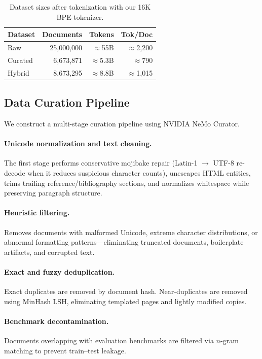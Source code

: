 \documentclass[10pt]{article}
\begin{document}
\begin{table}[H]
\centering
\caption{Dataset sizes after tokenization with our 16K BPE tokenizer.}
\label{tab:dataset_tokens}
\begin{tabular}{lrrr}
\toprule
\textbf{Dataset} & \textbf{Documents} & \textbf{Tokens} & \textbf{Tok/Doc} \\
\midrule
Raw     & 25,000,000 & $\approx$55B  & $\approx$2,200 \\
Curated & 6,673,871  & $\approx$5.3B & $\approx$790   \\
Hybrid  & 8,673,295  & $\approx$8.8B & $\approx$1,015 \\
\bottomrule
\end{tabular}
\end{table}

\subsection{Data Curation Pipeline}

We construct a multi-stage curation pipeline using NVIDIA NeMo Curator.

\paragraph{Unicode normalization and text cleaning.}
The first stage performs conservative mojibake repair (Latin-1 $\to$ UTF-8 re-decode when it reduces suspicious character counts), unescapes HTML entities, trims trailing reference/bibliography sections, and normalizes whitespace while preserving paragraph structure.

\paragraph{Heuristic filtering.}
Removes documents with malformed Unicode, extreme character distributions, or abnormal formatting patterns---eliminating truncated documents, boilerplate artifacts, and corrupted text.

\paragraph{Exact and fuzzy deduplication.}
Exact duplicates are removed by document hash. Near-duplicates are removed using MinHash LSH, eliminating templated pages and lightly modified copies.

\paragraph{Benchmark decontamination.}
Documents overlapping with evaluation benchmarks are filtered via $n$-gram matching to prevent train--test leakage.
\end{document}
